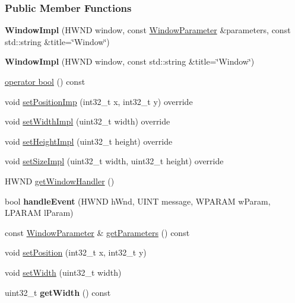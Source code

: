 \subsubsection*{Public Member Functions}
\begin{DoxyCompactItemize}
\item 
{\bfseries Window\+Impl} (H\+W\+ND window, const \hyperlink{a00091}{Window\+Parameter} \&parameters, const std\+::string \&title=\char`\"{}Window\char`\"{})\hypertarget{a00086_a2966b292162d9d4ac3e40b0eca984185}{}\label{a00086_a2966b292162d9d4ac3e40b0eca984185}

\item 
{\bfseries Window\+Impl} (H\+W\+ND window, const std\+::string \&title=\char`\"{}Window\char`\"{})\hypertarget{a00086_a3143a0e2cdcbaf88e55f9791c8a4fc97}{}\label{a00086_a3143a0e2cdcbaf88e55f9791c8a4fc97}

\item 
\hyperlink{a00086_a21a3e5b9d64ffe9a2db8062a603ee076}{operator bool} () const 
\item 
void \hyperlink{a00086_a8a3dd7b1047ebd09cc8157a98c6d6c72}{set\+Position\+Imp} (int32\+\_\+t x, int32\+\_\+t y) override
\item 
void \hyperlink{a00086_aa0b9a89ff73b90182d48152ac4b4f4dc}{set\+Width\+Impl} (uint32\+\_\+t width) override
\item 
void \hyperlink{a00086_a298a79f73edccaa8d673f90d23b8f1b8}{set\+Height\+Impl} (uint32\+\_\+t height) override
\item 
void \hyperlink{a00086_a44300292fa46bdd0d8eb9ee558750192}{set\+Size\+Impl} (uint32\+\_\+t width, uint32\+\_\+t height) override
\item 
H\+W\+ND \hyperlink{a00086_aba8c0c26368247565159027ae8efb780}{get\+Window\+Handler} ()
\item 
bool {\bfseries handle\+Event} (H\+W\+ND h\+Wnd, U\+I\+NT message, W\+P\+A\+R\+AM w\+Param, L\+P\+A\+R\+AM l\+Param)\hypertarget{a00086_a1c50a37f249f2f03f48fd62abc647b89}{}\label{a00086_a1c50a37f249f2f03f48fd62abc647b89}

\item 
const \hyperlink{a00091}{Window\+Parameter} \& \hyperlink{a00082_afbb0f8b825f17fbf8f434c4ab9ae5f8d}{get\+Parameters} () const 
\item 
void \hyperlink{a00082_ad6874b68c5cd0b59ec75ac8ad15f2a3a}{set\+Position} (int32\+\_\+t x, int32\+\_\+t y)
\item 
void \hyperlink{a00082_a3435c3bf0e07492ec77f3977c9b5e355}{set\+Width} (uint32\+\_\+t width)
\item 
uint32\+\_\+t {\bfseries get\+Width} () const \hypertarget{a00082_a8f13b82e3aa16ac711b2efd5411964d0}{}\label{a00082_a8f13b82e3aa16ac711b2efd5411964d0}


\end{DoxyCompactItemize}
